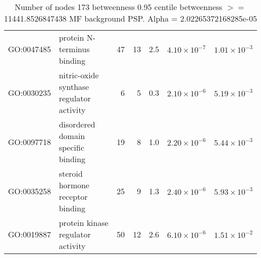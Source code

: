 \begin{table}[ht]
\begin{adjustbox}{max width=\textwidth}
\begin{tabular}{llrrrrr}
  GO:0047485 & protein N-terminus binding & 47 & 13 & 2.5 & $4.10 \times 10^{-7}$ & $1.01 \times 10^{-3}$ \\ 
  GO:0030235 & nitric-oxide synthase regulator activity & 6 & 5 & 0.3 & $2.10 \times 10^{-6}$ & $5.19 \times 10^{-3}$ \\ 
  GO:0097718 & disordered domain specific binding & 19 & 8 & 1.0 & $2.20 \times 10^{-6}$ & $5.44 \times 10^{-3}$ \\ 
  GO:0035258 & steroid hormone receptor binding & 25 & 9 & 1.3 & $2.40 \times 10^{-6}$ & $5.93 \times 10^{-3}$ \\ 
  GO:0019887 & protein kinase regulator activity & 50 & 12 & 2.6 & $6.10 \times 10^{-6}$ & $1.51 \times 10^{-2}$ \\ 
   \hline
\end{tabular}
\end{adjustbox}
\caption{Number of nodes 173 betweenness 0.95 centile  betweenness $>=$ 11441.8526847438 MF background PSP. Alpha = 2.02265372168285e-05} 
\label{tab:Number of nodes 173 betweenness 0.95 centile  betweenness $>=$ 11441.8526847438 MF background PSP. Alpha = 2.02265372168285e-05}
\end{table}



